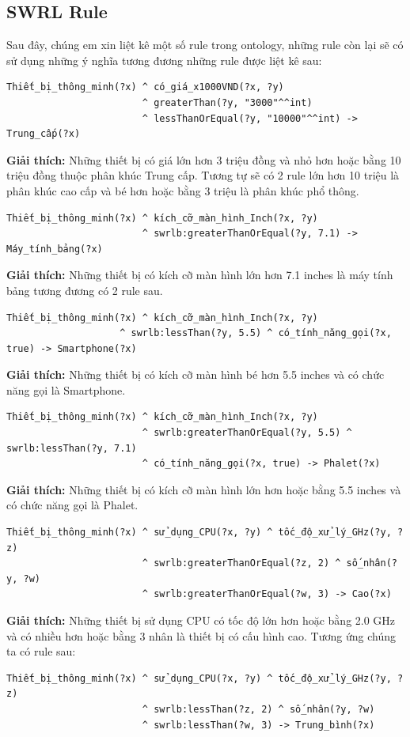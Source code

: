{\subsection{SWRL Rule}
Sau đây, chúng em xin liệt kê một số rule trong ontology, những rule còn lại sẽ có sử dụng những ý nghĩa tương đương những rule được liệt kê sau:
\begin{verbatim}
Thiết_bị_thông_minh(?x) ^ có_giá_x1000VND(?x, ?y) 
						^ greaterThan(?y, "3000"^^int) 
						^ lessThanOrEqual(?y, "10000"^^int) -> Trung_cấp(?x)
\end{verbatim}
\textbf{Giải thích:} Những thiết bị có giá lớn hơn 3 triệu đồng và nhỏ hơn hoặc bằng 10 triệu đồng thuộc phân khúc Trung cấp. Tương tự sẽ có 2 rule lớn hơn 10 triệu là phân khúc cao cấp và bé hơn hoặc bằng 3 triệu là phân khúc phổ thông.
\begin{verbatim}
Thiết_bị_thông_minh(?x) ^ kích_cỡ_màn_hình_Inch(?x, ?y) 
						^ swrlb:greaterThanOrEqual(?y, 7.1) -> Máy_tính_bảng(?x)
\end{verbatim}
\textbf{Giải thích:} Những thiết bị có kích cỡ màn hình lớn hơn 7.1 inches là máy tính bảng tương đương có 2 rule sau.
\begin{verbatim}
Thiết_bị_thông_minh(?x) ^ kích_cỡ_màn_hình_Inch(?x, ?y) 
					^ swrlb:lessThan(?y, 5.5) ^ có_tính_năng_gọi(?x, true) -> Smartphone(?x)
\end{verbatim}
\textbf{Giải thích:} Những thiết bị có kích cỡ màn hình bé hơn 5.5 inches và có chức năng gọi là Smartphone.
\begin{verbatim}
Thiết_bị_thông_minh(?x) ^ kích_cỡ_màn_hình_Inch(?x, ?y) 
						^ swrlb:greaterThanOrEqual(?y, 5.5) ^ swrlb:lessThan(?y, 7.1) 
						^ có_tính_năng_gọi(?x, true) -> Phalet(?x)
\end{verbatim}
\textbf{Giải thích:} Những thiết bị có kích cỡ màn hình lớn hơn hoặc bằng 5.5 inches và có chức năng gọi là Phalet.
\begin{verbatim}
Thiết_bị_thông_minh(?x) ^ sử_dụng_CPU(?x, ?y) ^ tốc_độ_xử_lý_GHz(?y, ?z) 
						^ swrlb:greaterThanOrEqual(?z, 2) ^ số_nhân(?y, ?w) 
						^ swrlb:greaterThanOrEqual(?w, 3) -> Cao(?x)
\end{verbatim}
\textbf{Giải thích:} Những thiết bị sử dụng CPU có tốc độ lớn hơn hoặc bằng 2.0 GHz và có nhiều hơn hoặc bằng 3 nhân là thiết bị có cấu hình cao. Tương ứng chúng ta có rule sau:
\begin{verbatim}
Thiết_bị_thông_minh(?x) ^ sử_dụng_CPU(?x, ?y) ^ tốc_độ_xử_lý_GHz(?y, ?z) 
						^ swrlb:lessThan(?z, 2) ^ số_nhân(?y, ?w) 
						^ swrlb:lessThan(?w, 3) -> Trung_bình(?x)

\end{verbatim}}
